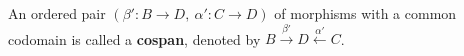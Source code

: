 \begin{definition}[Cospan]
    An ordered pair \( (\beta' : B \mathop{\to} D,~\alpha' : C \mathop{\to} D) \) of morphisms with a common codomain is called a \textbf{cospan}, denoted by \( B \overset{\beta'}{\rightarrow} D \overset{\alpha'}{\leftarrow} C \). 
\end{definition} 